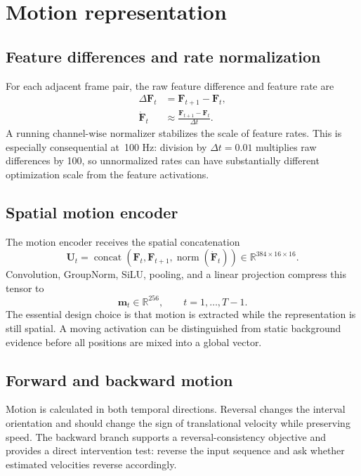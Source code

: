 \documentclass[11pt,a4paper]{article}
\newcommand{\R}{\mathbb{R}}\newcommand{\norm}[1]{\left\lVert #1\right\rVert}\newcommand{\E}{\mathbb{E}}\newcommand{\dt}{\Delta t}
\begin{document}
\section{Motion representation}
\subsection{Feature differences and rate normalization}
For each adjacent frame pair, the raw feature difference and feature rate are
\begin{align}
\Delta\bm F_t &= \bm F_{t+1}-\bm F_t,\\
\dot{\bm F}_t &\approx \frac{\bm F_{t+1}-\bm F_t}{\dt}.
\end{align}
A running channel-wise normalizer stabilizes the scale of feature rates. This is especially consequential at \,100 Hz: division by $\dt=0.01$ multiplies raw differences by 100, so unnormalized rates can have substantially different optimization scale from the feature activations.

\subsection{Spatial motion encoder}
The motion encoder receives the spatial concatenation
\begin{equation}
\bm U_t=\operatorname{concat}\left(\bm F_t,\bm F_{t+1},\operatorname{norm}(\dot{\bm F}_t)\right)
\in\R^{384\times16\times16}.
\end{equation}
Convolution, GroupNorm, SiLU, pooling, and a linear projection compress this tensor to
\begin{equation}
\bm m_t\in\R^{256},\qquad t=1,\ldots,T-1.
\end{equation}
The essential design choice is that motion is extracted while the representation is still spatial. A moving activation can be distinguished from static background evidence before all positions are mixed into a global vector.

\subsection{Forward and backward motion}
Motion is calculated in both temporal directions. Reversal changes the interval orientation and should change the sign of translational velocity while preserving speed. The backward branch supports a reversal-consistency objective and provides a direct intervention test: reverse the input sequence and ask whether estimated velocities reverse accordingly.
\end{document}
